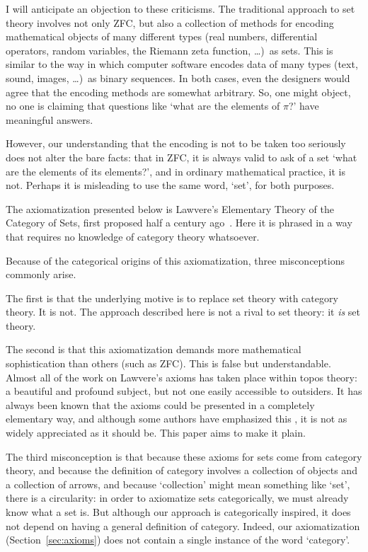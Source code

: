 \documentclass[12pt]{article}
\begin{document}
I will anticipate an objection to these criticisms.  The traditional
approach to set theory involves not only ZFC, but also a collection of
methods for encoding mathematical objects of many different types (real
numbers, differential operators, random variables, the Riemann zeta
function, \ldots)\ as sets.  This is similar to the way in which computer
software encodes data of many types (text, sound, images, \ldots)\ as
binary sequences.  In both cases, even the designers would agree that the
encoding methods are somewhat arbitrary.  So, one might object, no one 
is claiming that questions like `what are the elements of $\pi$?' have 
meaningful answers.

However, our understanding that the encoding is not to be taken too
seriously does not alter the bare facts: that in ZFC, it is always valid to
ask of a set `what are the elements of its elements?', and in ordinary
mathematical practice, it is not.  Perhaps it is misleading to use the same
word, `set', for both purposes.


The axiomatization presented below is Lawvere's Elementary Theory of the
Category of Sets, first proposed half a century ago~\cite{LawvETCS,LawvETCS2}.
Here it is phrased in a way that requires no knowledge of category theory
whatsoever.  

Because of the categorical origins of this axiomatization, three
misconceptions commonly arise.

The first is that the underlying motive is to replace set theory with
category theory.  It is not.  The approach described here is not a rival to
set theory: it \emph{is} set theory.

The second is that this axiomatization demands more mathematical
sophistication than others (such as ZFC).  This is false but
understandable.  Almost all of the work on Lawvere's axioms has taken place
within topos theory: a beautiful and profound subject, but not one easily
accessible to outsiders.  It has always been known that the axioms could be
presented in a completely elementary way, and although some authors have 
emphasized this \cite{LawvETCS,LaRo,MacLMFF,McLaNCB,McLaFOM}, it is not as
widely appreciated as it should be.  This paper aims to make it plain.

The third misconception is that because these axioms for sets come from
category theory, and because the definition of category involves a
collection of objects and a collection of arrows, and because `collection'
might mean something like `set', there is a circularity: in order to
axiomatize sets categorically, we must already know what a set is.  But
although our approach is categorically inspired, it does not depend on
having a general definition of category.  Indeed, our axiomatization
(Section~\ref{sec:axioms}) does not contain a single instance of the word
`category'.
\end{document}
